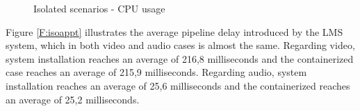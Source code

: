 \begin{figure}[!htb]
  \begin{center}
    \begin{subfigmatrix}{2}
    \end{subfigmatrix}
    \caption{Isolated scenarios - CPU usage}
    \label{F:isoCPU}
  \end{center}
\end{figure}

Figure \ref{F:isoappt} illustrates the average pipeline delay introduced by the LMS system, which in both video and audio cases is almost the same. Regarding video, system installation reaches an average of 216,8 milliseconds and the containerized case reaches an average of 215,9 milliseconds. Regarding audio, system installation reaches an average of 25,6 milliseconds and the containerized reaches an average of 25,2 milliseconds.

